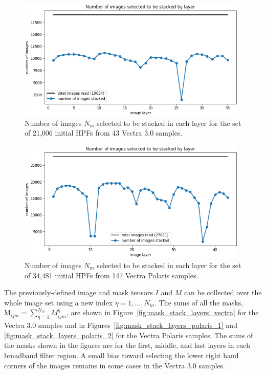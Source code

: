 \documentclass[letterpaper,11pt]{article}
\newcommand{\reffig}[1]{Figure~\ref{#1}}
\newcommand{\Mu}{\mathrm{M}}
\begin{document}
\begin{figure}[!ht]
\centering
\includegraphics[width=0.98\textwidth]{images/measuring_flatfield_corrections/n_images_stacked_per_layer_vectra}
\caption{\footnotesize Number of images $N_{m}$ selected to be stacked in each layer for the set of 21,006 initial HPFs from 43 Vectra 3.0 samples.}
\label{fig:n_images_stacked_by_layer_vectra}
\end{figure}

\begin{figure}[!ht]
\centering
\includegraphics[width=0.98\textwidth]{images/measuring_flatfield_corrections/n_images_stacked_per_layer_polaris}
\caption{\footnotesize Number of images $N_{m}$ selected to be stacked in each layer for the set of 34,481 initial HPFs from 147 Vectra Polaris samples.}
\label{fig:n_images_stacked_by_layer_polaris}
\end{figure}

The previously-defined image and mask tensors $I$ and $M$ can be collected over the whole image set using a new index $\eta=1,\ldots,N_{m}$. The sums of all the masks, $\Mu_{ijm} = \sum_{\eta=1}^{N_{m}} M^{\eta}_{ijm}$, are shown in \reffig{fig:mask_stack_layers_vectra} for the Vectra 3.0 samples and in Figures~\ref{fig:mask_stack_layers_polaris_1} and \ref{fig:mask_stack_layers_polaris_2} for the Vectra Polaris samples. The sums of the masks shown in the figures are for the first, middle, and last layers in each broadband filter region. A small bias toward selecting the lower right hand corners of the images remains in some cases in the Vectra 3.0 samples. 
\end{document}
